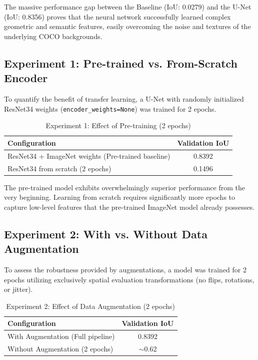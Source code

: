 \documentclass[11pt,a4paper]{article}
\begin{document}
The massive performance gap between the Baseline (IoU: 0.0279) and the U-Net (IoU: 0.8356) proves that the neural network successfully learned complex geometric and semantic features, easily overcoming the noise and textures of the underlying COCO backgrounds.

\subsection{Experiment 1: Pre-trained vs. From-Scratch Encoder}
To quantify the benefit of transfer learning, a U-Net with randomly initialized ResNet34 weights (\texttt{encoder\_weights=None}) was trained for 2 epochs.

\begin{table}[H]
    \centering
    \caption{Experiment 1: Effect of Pre-training (2 epochs)}
    \begin{tabular}{lc}
        \toprule
        \textbf{Configuration} & \textbf{Validation IoU} \\
        \midrule
        ResNet34 + ImageNet weights (Pre-trained baseline) & 0.8392 \\
        ResNet34 from scratch (2 epochs) & 0.1496 \\
        \bottomrule
    \end{tabular}
    \label{tab:exp1}
\end{table}

The pre-trained model exhibits overwhelmingly superior performance from the very beginning. Learning from scratch requires significantly more epochs to capture low-level features that the pre-trained ImageNet model already possesses.

\subsection{Experiment 2: With vs. Without Data Augmentation}
To assess the robustness provided by augmentations, a model was trained for 2 epochs utilizing exclusively spatial evaluation transformations (no flips, rotations, or jitter).

\begin{table}[H]
    \centering
    \caption{Experiment 2: Effect of Data Augmentation (2 epochs)}
    \begin{tabular}{lc}
        \toprule
        \textbf{Configuration} & \textbf{Validation IoU} \\
        \midrule
        With Augmentation (Full pipeline) & 0.8392 \\
        Without Augmentation (2 epochs) & $\sim$0.62 \\
        \bottomrule
    \end{tabular}
    \label{tab:exp2}
\end{table}
\end{document}
